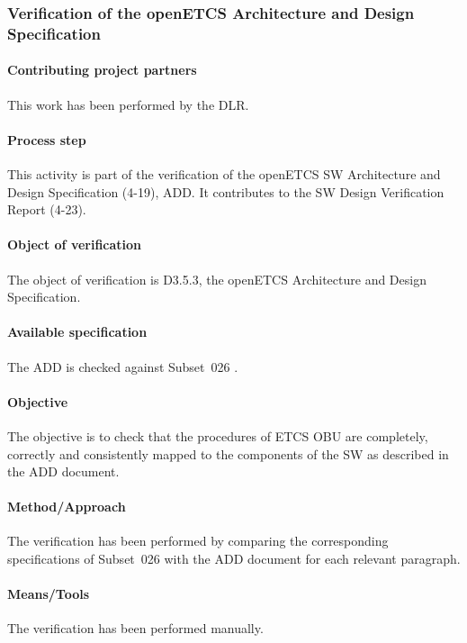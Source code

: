 

\subsubsection{Verification of the openETCS Architecture and Design Specification}
\label{sec:}

\paragraph{Contributing project partners}
This work has been performed by the DLR.

\paragraph{Process step}
This activity is part of the verification of the openETCS SW
Architecture and Design Specification (4-19), ADD. It contributes to the SW
Design Verification Report (4-23).

\paragraph{Object of verification}
The object of verification is D3.5.3, the openETCS Architecture and
Design Specification.

\paragraph{Available specification}
The ADD is checked against
Subset~026 \cite{subset-026:3.3.0}.

\paragraph{Objective}
The objective is to check that the procedures of ETCS OBU are completely,
correctly and consistently mapped to the components of the SW as
described in the ADD document.

\paragraph{Method/Approach}
The verification has been performed by comparing the corresponding
specifications of Subset~026 with the ADD document for each relevant
paragraph.

\paragraph{Means/Tools}
The verification has been performed manually.

